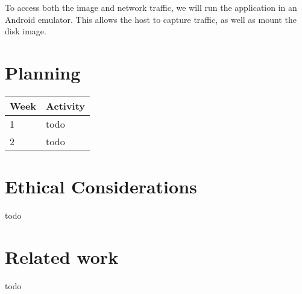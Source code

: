 \documentclass{article}
\begin{document}
To access both the image and network traffic, we will run the application in an
Android emulator. This allows the host to capture traffic, as well as mount the
disk image.


\section{Planning}

\begin{tabular}[H]{ | l | p{10.2cm} | }
	\hline
	\textbf{Week} & \textbf{Activity} \\
	\hline 1 & todo \\
	\hline 2 & todo \\
	\hline
\end{tabular}


\section{Ethical Considerations}

todo


\section{Related work}

todo


\printbibliography
\end{document}
